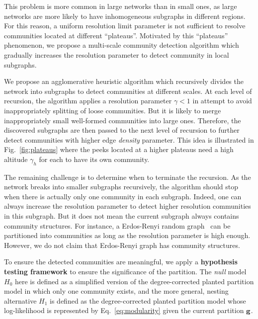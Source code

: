 This problem is more common in large networks than in small ones, as large networks are more likely to have inhomogeneous subgraphs in different regions. For this reason, a uniform resolution limit parameter is not sufficient to resolve communities located at different ``plateaus''. Motivated by this ``plateaus'' phenomenon, we propose a multi-scale community detection algorithm which gradually increases the resolution parameter to detect community in local subgraphs.

We propose an agglomerative heuristic algorithm which recursively divides the network into subgraphs to detect communities at different scales. At each level of recursion, the algorithm applies a resolution parameter $\gamma < 1$ in attempt to avoid inappropriately splitting of loose communities. But it is likely to merge inappropriately small well-formed communities into large ones. Therefore, the discovered subgraphs are then passed to the next level of recursion to further detect communities with higher edge {\it density} parameter. This idea is illustrated in Fig.~\ref{fig:plateaus} where the peeks located at a higher plateaus need a high altitude $\gamma_h$ for each to have its own community.

The remaining challenge is to determine when to terminate the recursion. As the network breaks into smaller subgraphs recursively, the algorithm should stop when there is actually only one community in each subgraph. Indeed, one can always increase the resolution parameter to detect higher resolution communities in this subgraph. But it does not mean the current subgraph always contains community structures. For instance, a Erdos-Renyi random graph~\cite{erdHos1960evolution} can be partitioned into communities as long as the resolution parameter is high enough. However, we do not claim that Erdos-Renyi graph has community structures.

To ensure the detected communities are meaningful, we apply a {\bf hypothesis testing framework} to ensure the significance of the partition. The \textit{null} model $H_0$ here is defined as a simplified version of the degree-corrected planted partition model in which only one community exists, and the more general, nesting alternative $H_1$ is defined as the degree-corrected planted partition model whose log-likelihood is represented by Eq.~\ref{eq:modularity} given the current partition $\bf g$. 

